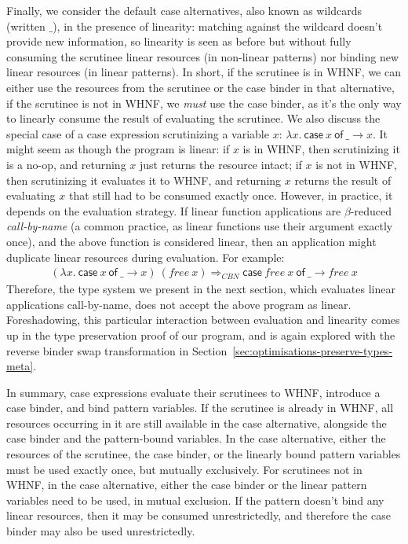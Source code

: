 \documentclass[acmsmall,review]{acmart}
\newcommand{\parawith}[1]{\paragraph{\emph{#1}}}
\newcommand{\ccase}[2]{\mathsf{case}~#1~\mathsf{of}~#2}
\begin{document}
Finally, we consider the default case alternatives, also known as wildcards
(written $\_$), in the presence of linearity: matching against the wildcard
doesn't provide new information, so linearity is seen as before but without
fully consuming the scrutinee linear resources (in non-linear patterns) nor
binding new linear resources (in linear patterns). In short, if the scrutinee
is in WHNF, we can either use the resources from the scrutinee or the case
binder in that alternative, if the scrutinee is not in WHNF, we \emph{must} use
the case binder, as it's the only way to linearly consume the result of
evaluating the scrutinee. We also discuss the special case of a case
expression scrutinizing a variable $x$:
$
\lambda x.~\ccase{x}{\_ \to x}
$. 
It might seem as though the program is linear:
if $x$ is in WHNF, then scrutinizing it is a no-op, and returning $x$
just returns the resource intact;
if $x$ is not in WHNF, then scrutinizing it evaluates it to WHNF, and
returning $x$ returns the result of evaluating $x$ that still had to be
consumed exactly once.
However, in practice, it depends on the evaluation strategy. If linear function
applications are $\beta$-reduced \emph{call-by-name} (a common practice, as
linear functions use their argument exactly once), and the above function is
considered linear, then an application might duplicate linear resources during
evaluation. For example:
\[
\begin{array}{l}
(\lambda x.~\ccase{x}{\_ \to x})~(free~x)
\Longrightarrow_{CBN}
\ccase{free~x}{\_ \to free~x}
\end{array}
\]
Therefore, the type system we present in the next section, which evaluates
linear applications call-by-name, does not accept the above program as linear.
Foreshadowing, this particular interaction between evaluation and linearity
comes up in the type preservation proof of our program, and is again explored
with the reverse binder swap transformation in
Section~\ref{sec:optimisations-preserve-types-meta}.

In summary, case expressions evaluate their scrutinees to WHNF,
introduce a case binder, and bind pattern variables. If the scrutinee is
already in WHNF, all resources occurring in it are still available in the case
alternative, alongside the case binder and the pattern-bound variables. In the
case alternative, either the resources of the scrutinee, the case binder, or
the linearly bound pattern variables must be used exactly once, but mutually
exclusively. For scrutinees not in WHNF, in the case alternative, either the
case binder or the linear pattern variables need to be used, in mutual exclusion.
If the pattern doesn't bind any linear resources, then it may be consumed
unrestrictedly, and therefore the case binder may also be used unrestrictedly.
\end{document}
